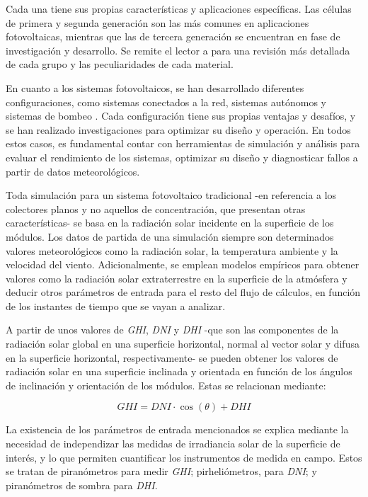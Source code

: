 Cada una tiene sus propias características y aplicaciones específicas. Las células de primera y segunda generación son las más comunes en aplicaciones fotovoltaicas, mientras que las de tercera generación se encuentran en fase de investigación y desarrollo. Se remite el lector a \cite{Shubbak_2019} para una revisión más detallada de cada grupo y las peculiaridades de cada material.

En cuanto a los sistemas fotovoltaicos, se han desarrollado diferentes configuraciones, como sistemas conectados a la red, sistemas autónomos y sistemas de bombeo \cite{Perpinan2020}. Cada configuración tiene sus propias ventajas y desafíos, y se han realizado investigaciones para optimizar su diseño y operación. En todos estos casos, es fundamental contar con herramientas de simulación y análisis para evaluar el rendimiento de los sistemas, optimizar su diseño y diagnosticar fallos a partir de datos meteorológicos.

Toda simulación para un sistema fotovoltaico tradicional -en referencia a los colectores planos y no aquellos de concentración, que presentan otras características- se basa en la radiación solar incidente en la superficie de los módulos. Los datos de partida de una simulación siempre son determinados valores meteorológicos como la radiación solar, la temperatura ambiente y la velocidad del viento. Adicionalmente, se emplean modelos empíricos para obtener valores como la radiación solar extraterrestre en la superficie de la atmósfera y deducir otros parámetros de entrada para el resto del flujo de cálculos, en función de los instantes de tiempo que se vayan a analizar.

A partir de unos valores de \textit{GHI}, \textit{DNI} y \textit{DHI} -que son las componentes de la radiación solar global en una superficie horizontal, normal al vector solar y difusa en la superficie horizontal, respectivamente- se pueden obtener los valores de radiación solar en una superficie inclinada y orientada en función de los ángulos de inclinación y orientación de los módulos. Estas se relacionan mediante:

\begin{equation}
      GHI = DNI \cdot \cos(\theta) + DHI
\end{equation}

La existencia de los parámetros de entrada mencionados se explica mediante la necesidad de independizar las medidas de irradiancia solar de la superficie de interés, y lo que permiten cuantificar los instrumentos de medida en campo. Estos se tratan de piranómetros para medir \textit{GHI}; pirheliómetros, para \textit{DNI}; y piranómetros de sombra para \textit{DHI}.

